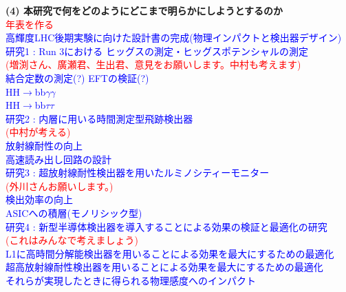 \documentclass[11pt,a4j,dvipdfmx]{jarticle} 					%
\newcommand{\研究課題名}{新型半導体検出器を用いた真空の解明}
\newcommand{\研究機関名}{高エネルギー加速器研究機構}
\newcommand{\研究代表者氏名}{中村浩二}
\newcommand{\研究期間の最終元号年度}{10}  %
\newcommand{\TODO}[1]{\textcolor{red}{#1}}
\newcommand{\MEMO}[1]{\textcolor{blue}{#1}}
\begin{document}
\noindent\colorbox[gray]{0.9}{\textbf{(4) 本研究で何をどのようにどこまで明らかにしようとするのか}}\\
\TODO{年表を作る}\\
\MEMO{
高輝度LHC後期実験に向けた設計書の完成(物理インパクトと検出器デザイン)\\
研究1 : Run 3における ヒッグスの測定・ヒッグスポテンシャルの測定\\
    \hspace{1cm} \TODO{(増渕さん、廣瀬君、生出君、意見をお願いします。中村も考えます)}\\
    \hspace{1cm} 結合定数の測定(?) EFTの検証(?)\\
    \hspace{1cm} HH$\to$bb$\gamma\gamma$\\
    \hspace{1cm} HH$\to$bb$\tau\tau$\\
研究2 : 内層に用いる時間測定型飛跡検出器\\
    \hspace{1cm} \TODO{(中村が考える)}\\
    \hspace{1cm} 放射線耐性の向上\\
    \hspace{1cm} 高速読み出し回路の設計\\
研究3 : 超放射線耐性検出器を用いたルミノシティーモニター\\
    \hspace{1cm} \TODO{(外川さんお願いします。)}\\
    \hspace{1cm} 検出効率の向上\\
    \hspace{1cm} ASICへの積層(モノリシック型)\\
研究4 : 新型半導体検出器を導入することによる効果の検証と最適化の研究\\
    \hspace{1cm} \TODO{(これはみんなで考えましょう)}\\
    \hspace{1cm} L1に高時間分解能検出器を用いることによる効果を最大にするための最適化\\
    \hspace{1cm} 超高放射線耐性検出器を用いることによる効果を最大にするための最適化\\
    \hspace{1cm} それらが実現したときに得られる物理感度へのインパクト\\
}
\end{document}
